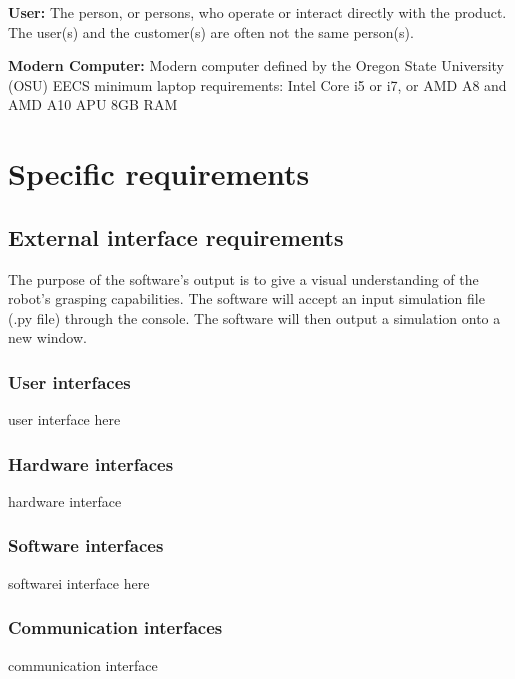 \documentclass[10pt,journal,compsoc,draftclsnofoot]{IEEEtran}
\begin{document}
\begin{flushleft}
\vspace{3mm}
\textbf{User:}
The person, or persons, who operate or interact directly with the product. The user(s) and the customer(s) are often not the same person(s).

\vspace{3mm}
\textbf{Modern Computer:}
Modern computer defined by the Oregon State University (OSU) EECS minimum laptop requirements: 
Intel Core i5 or i7, or AMD A8 and AMD A10 APU 8GB RAM


\newpage

\section{Specific requirements}
\vspace{3mm}

\subsection{External interface requirements}
\vspace{3mm}
The purpose of the software's output is to give a visual understanding of the robot's grasping capabilities.
The software will accept an input simulation file (.py file) through the console.
The software will then output a simulation onto a new window.

\subsubsection{User interfaces}
\vspace{3mm}
user interface here

\subsubsection{Hardware interfaces}
\vspace{3mm}
hardware interface

\subsubsection{Software interfaces}
\vspace{3mm}
softwarei interface here

\subsubsection{Communication interfaces}
\vspace{3mm}
communication interface


\end{flushleft}
\end{document}
